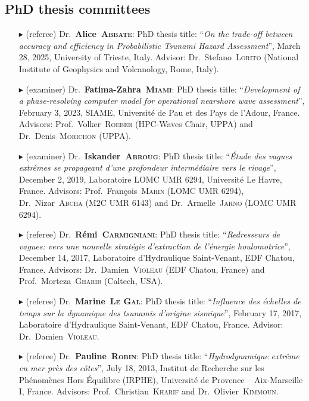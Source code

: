     \subsection{PhD thesis committees}
    \begin{itemize}
        \item[$\blacktriangleright$] (referee) Dr.~\textbf{Alice~\textsc{Abbate}}: PhD thesis title: ``\textit{On the trade-off between accuracy and efficiency in Probabilistic Tsunami Hazard Assessment}'', March 28, 2025, University of Trieste, Italy. Advisor: Dr.~Stefano~\textsc{Lorito} (National Institute of Geophysics and Volcanology, Rome, Italy).
        \item[$\blacktriangleright$] (examiner) Dr.~\textbf{Fatima-Zahra~\textsc{Miami}}: PhD thesis title: ``\textit{Development of a phase-resolving computer model for operational nearshore wave assessment}'', February 3, 2023, SIAME, Universit\'e de Pau et des Pays de l'Adour, France. Advisors: Prof.~Volker~\textsc{Roeber} (HPC-Waves Chair, UPPA) and Dr.~Denis~\textsc{Morichon} (UPPA). 
        \item[$\blacktriangleright$] (examiner) Dr.~\textbf{Iskander~\textsc{Abroug}}: PhD thesis title: ``\textit{\'Etude des vagues extr\^emes se propageant d'une profondeur interm\'ediaire vers le rivage}'', December 2, 2019, Laboratoire LOMC UMR 6294, Universit\'e Le Havre, France. Advisors: Prof.~Fran\c{c}ois~\textsc{Marin} (LOMC UMR 6294), Dr.~Nizar~\textsc{Abcha} (M2C UMR 6143) and Dr.~Armelle~\textsc{Jarno} (LOMC UMR 6294).
        \item[$\blacktriangleright$] (referee) Dr.~\textbf{R\'emi~\textsc{Carmigniani}}: PhD thesis title: ``\textit{Redresseurs de vagues: vers une nouvelle strat\'egie d'extraction de l'\'energie houlomotrice}'', December 14, 2017, Laboratoire d'Hydraulique Saint-Venant, EDF Chatou, France. Advisors: Dr.~Damien~\textsc{Violeau} (EDF Chatou, France) and Prof.~Morteza~\textsc{Gharib} (Caltech, USA).
        \item[$\blacktriangleright$] (referee) Dr.~\textbf{Marine~\textsc{Le Gal}}: PhD thesis title: ``\textit{Influence des \'echelles de temps sur la dynamique des tsunamis d'origine sismique}'', February 17, 2017, Laboratoire d'Hydraulique Saint-Venant, EDF Chatou, France. Advisor: Dr.~Damien~\textsc{Violeau}.
        \item[$\blacktriangleright$] (referee) Dr.~\textbf{Pauline~\textsc{Robin}}: PhD thesis title: ``\textit{Hydrodynamique extr\^eme en mer pr\`es des c\^otes}'', July 18, 2013, Institut de Recherche sur les Ph\'enom\`enes Hors \'Equilibre (IRPHE), Universit\'e de Provence -- Aix-Marseille I, France. Advisors: Prof.~Christian~\textsc{Kharif} and Dr.~Olivier~\textsc{Kimmoun}.

\end{itemize}
